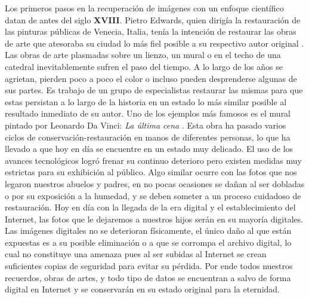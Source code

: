 \begin{introduction}\label{chapter:introduction}

Los primeros pasos en la recuperaci\'on de imágenes con un enfoque científico datan de antes del siglo \textbf{XVIII}. Pietro Edwards, quien dirigía la restauraci\'on de las pinturas p\'ublicas de Venecia, Italia, ten\'ia la intenci\'on de restaurar las obras de arte que atesoraba su ciudad lo m\'as fiel posible a su respectivo autor original \cite{darrow2000pietro}. Las obras de arte plasmadas sobre un lienzo, un mural o en el techo de una catedral inevitablemente sufren el paso del tiempo. A lo largo de los años se agrietan, pierden poco a poco el color o incluso pueden desprenderse algunas de sus partes. Es trabajo de un grupo de especialistas restaurar las mismas para que estas persistan a lo largo de la historia en un estado lo m\'as similar posible al resultado inmediato de su autor. Uno de los ejemplos m\'as famosos es el mural pintado por Leonardo Da Vinci: \textit{La \'ultima cena} \cite{king2012leonardo}. Esta obra ha pasado varios ciclos de conservaci\'on-restauraci\'on en manos de diferentes personas, lo que ha llevado a que hoy en d\'ia se encuentre en un estado muy delicado. El uso de los avances tecnológicos \cite{salvatori2020nature} logr\'o frenar su continuo deterioro pero existen medidas muy estrictas para su exhibición al p\'ublico. Algo similar ocurre con las fotos que nos legaron nuestros abuelos y padres, en no pocas ocasiones se dañan al ser dobladas o por su exposici\'on a la humedad, y se deben someter a un proceso cuidadoso de restauraci\'on. Hoy en d\'ia con la llegada de la era digital y el establecimiento del Internet, las fotos que le dejaremos a nuestros hijos ser\'an en su mayor\'ia digitales. Las im\'agenes digitales no se deterioran físicamente, el \'unico daño al que est\'an expuestas es a su posible eliminaci\'on o a que se corrompa el archivo digital, lo cual no constituye una amenaza pues al ser subidas al Internet se crean suficientes copias de seguridad para evitar su p\'erdida. Por ende todos nuestros recuerdos, obras de artes, y todo tipo de datos se encuentran a salvo de forma digital en Internet y se conservar\'an en su estado original para la eternidad.


\end{introduction}
